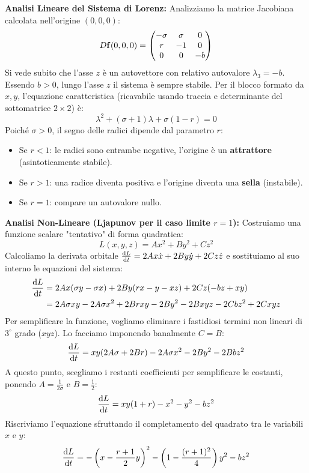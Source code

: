 \documentclass[openany]{book}
\theoremstyle{definition}
\theoremstyle{remark}
\begin{document}
\textbf{Analisi Lineare del Sistema di Lorenz:}
Analizziamo la matrice Jacobiana calcolata nell'origine $(0,0,0)$:
\begin{equation*}
    D\vb{f}(0,0,0) = \begin{pmatrix} 
        -\sigma & \sigma & 0 \\ 
        r & -1 & 0 \\ 
        0 & 0 & -b 
    \end{pmatrix}
\end{equation*}
Si vede subito che l'asse $z$ è un autovettore con relativo autovalore $\lambda_3 = -b$. Essendo $b > 0$, lungo l'asse $z$ il sistema è sempre stabile.
Per il blocco formato da $x, y$, l'equazione caratteristica (ricavabile usando traccia e determinante del sottomatrice $2\times 2$) è:
\begin{equation*}
    \lambda^2 + (\sigma + 1)\lambda + \sigma(1 - r) = 0
\end{equation*}
Poiché $\sigma > 0$, il segno delle radici dipende dal parametro $r$:
\begin{itemize}
    \item Se $r < 1$: le radici sono entrambe negative, l'origine è un \textbf{attrattore} (asintoticamente stabile).
    \item Se $r > 1$: una radice diventa positiva e l'origine diventa una \textbf{sella} (instabile).
    \item Se $r = 1$: compare un autovalore nullo.
\end{itemize}

\textbf{Analisi Non-Lineare (Ljapunov per il caso limite $r=1$):}
Costruiamo una funzione scalare "tentativo" di forma quadratica:
\begin{equation*}
    L(x,y,z) = Ax^2 + By^2 + Cz^2
\end{equation*}
Calcoliamo la derivata orbitale $\dv{L}{t} = 2Ax\dot{x} + 2By\dot{y} + 2Cz\dot{z}$ e sostituiamo al suo interno le equazioni del sistema:
\begin{align*}
    \dv{L}{t} &= 2Ax(\sigma y - \sigma x) + 2By(rx - y - xz) + 2Cz(-bz + xy) \\
    &= 2A\sigma xy - 2A\sigma x^2 + 2Brxy - 2By^2 - 2Bxyz - 2Cbz^2 + 2Cxyz
\end{align*}
Per semplificare la funzione, vogliamo eliminare i fastidiosi termini non lineari di $3^\circ$ grado ($xyz$). Lo facciamo imponendo banalmente $C = B$:
\begin{equation*}
    \dv{L}{t} = xy(2A\sigma + 2Br) - 2A\sigma x^2 - 2By^2 - 2Bbz^2
\end{equation*}
A questo punto, scegliamo i restanti coefficienti per semplificare le costanti, ponendo $A = \frac{1}{2\sigma}$ e $B = \frac{1}{2}$:
\begin{equation*}
    \dv{L}{t} = xy(1 + r) - x^2 - y^2 - bz^2
\end{equation*}
Riscriviamo l'equazione sfruttando il completamento del quadrato tra le variabili $x$ e $y$:
\begin{equation}
    \dv{L}{t} = - \left(x - \frac{r+1}{2}y\right)^2 - \left(1 - \frac{(r+1)^2}{4}\right)y^2 - bz^2
\end{equation}
\end{document}
